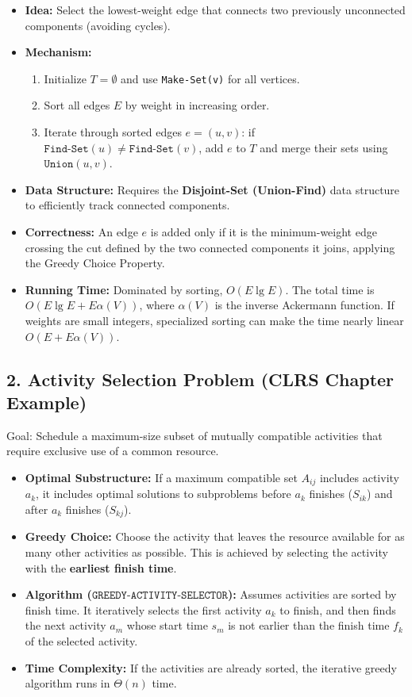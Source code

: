 \documentclass{article}
\begin{document}
\begin{itemize}
    \item \textbf{Idea:} Select the lowest-weight edge that connects two previously unconnected components (avoiding cycles).
    \item \textbf{Mechanism:}
    \begin{enumerate}
        \item Initialize $T = \emptyset$ and use \texttt{Make-Set(v)} for all vertices.
        \item Sort all edges $E$ by weight in increasing order.
        \item Iterate through sorted edges $e=(u, v)$: if $\texttt{Find-Set}(u) \ne \texttt{Find-Set}(v)$, add $e$ to $T$ and merge their sets using $\texttt{Union}(u, v)$.
    \end{enumerate}
    \item \textbf{Data Structure:} Requires the \textbf{Disjoint-Set (Union-Find)} data structure to efficiently track connected components.
    \item \textbf{Correctness:} An edge $e$ is added only if it is the minimum-weight edge crossing the cut defined by the two connected components it joins, applying the Greedy Choice Property.
    \item \textbf{Running Time:} Dominated by sorting, $O(E \lg E)$. The total time is $O(E \lg E + E\alpha(V))$, where $\alpha(V)$ is the inverse Ackermann function. If weights are small integers, specialized sorting can make the time nearly linear $O(E + E\alpha(V))$.
\end{itemize}

\subsection{2. Activity Selection Problem (CLRS Chapter Example)}

Goal: Schedule a maximum-size subset of mutually compatible activities that require exclusive use of a common resource.

\begin{itemize}
    \item \textbf{Optimal Substructure:} If a maximum compatible set $A_{ij}$ includes activity $a_k$, it includes optimal solutions to subproblems before $a_k$ finishes ($S_{ik}$) and after $a_k$ finishes ($S_{kj}$).
    \item \textbf{Greedy Choice:} Choose the activity that leaves the resource available for as many other activities as possible. This is achieved by selecting the activity with the \textbf{earliest finish time}.
    \item \textbf{Algorithm ($\texttt{GREEDY-ACTIVITY-SELECTOR}$):} Assumes activities are sorted by finish time. It iteratively selects the first activity $a_k$ to finish, and then finds the next activity $a_m$ whose start time $s_m$ is not earlier than the finish time $f_k$ of the selected activity.
    \item \textbf{Time Complexity:} If the activities are already sorted, the iterative greedy algorithm runs in $\Theta(n)$ time.
\end{itemize}
\end{document}
